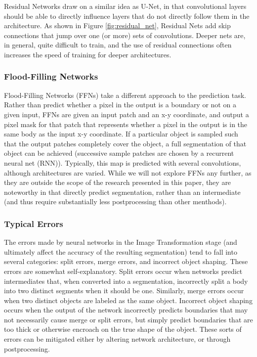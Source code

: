 Residual Networks draw on a similar idea as U-Net, in that convolutional layers should be able to directly influence layers that do not directly follow them in the architecture\cite{He2015}. As shown in Figure \ref{fig:residual_net}, Residual Nets add skip connections that jump over one (or more) sets of convolutions. Deeper nets are, in general, quite difficult to train, and the use of residual connections often increases the speed of training for deeper architectures.

\subsubsection{Flood-Filling Networks}
Flood-Filling Networks (FFNs) take a different approach to the prediction task. Rather than predict whether a pixel in the output is a boundary or not on a given input, FFNs are given an input patch and an x-y coordinate, and output a pixel mask for that patch that represents whether a pixel in the output is in the same body as the input x-y coordinate\cite{Januszewski2016}. If a particular object is sampled such that the output patches completely cover the object, a full segmentation of that object can be achieved (successive sample patches are chosen by a recurrent neural net (RNN)). Typically, this map is predicted with several convolutions, although architectures are varied. While we will not explore FFNs any further, as they are outside the scope of the research presented in this paper, they are noteworthy in that directly predict segmentation, rather than an intermediate (and thus require substantially less postprocessing than other menthods).


\subsubsection{Typical Errors}
The errors made by neural networks in the Image Transformation stage (and ultimately affect the accuracy of the resulting segmentation) tend to fall into several categories: split errors, merge errors, and incorrect object shaping. These errors are somewhat self-explanatory. Split errors occur when networks predict intermediates that, when converted into a segmentation, incorrectly split a body into two distinct segments when it should be one. Similarly, merge errors occur when two distinct objects are labeled as the same object. Incorrect object shaping occurs when the output of the network incorrectly predicts boundaries that may not necessarily cause merge or split errors, but simply predict boundaries that are too thick or otherwise encroach on the true shape of the object. These sorts of errors can be mitigated either by altering network architecture, or through postprocessing.

